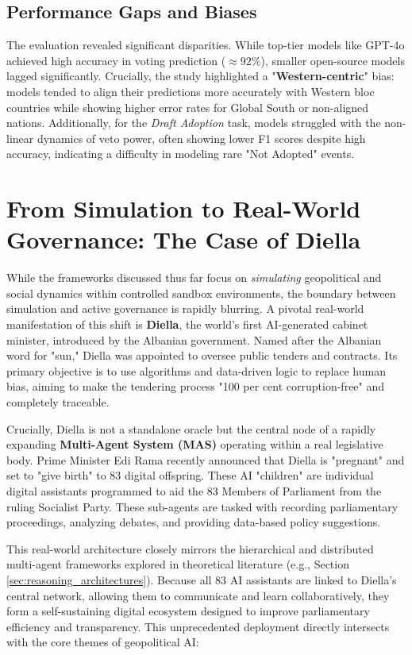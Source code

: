 \subsection{Performance Gaps and Biases}
The evaluation revealed significant disparities. While top-tier models like GPT-4o achieved high accuracy in voting prediction (\textbf{$\approx 92\%$}), smaller open-source models lagged significantly.
Crucially, the study highlighted a "\textbf{Western-centric}" bias: models tended to align their predictions more accurately with Western bloc countries while showing higher error rates for Global South or non-aligned nations. Additionally, for the \textit{Draft Adoption} task, models struggled with the non-linear dynamics of veto power, often showing lower F1 scores despite high accuracy, indicating a difficulty in modeling rare "Not Adopted" events.

\section{From Simulation to Real-World Governance: The Case of Diella}
\label{sec:diella_real_world}

While the frameworks discussed thus far focus on \textit{simulating} geopolitical and social dynamics within controlled sandbox environments, the boundary between simulation and active governance is rapidly blurring. A pivotal real-world manifestation of this shift is \textbf{Diella}, the world's first AI-generated cabinet minister, introduced by the Albanian government. Named after the Albanian word for "sun," Diella was appointed to oversee public tenders and contracts. Its primary objective is to use algorithms and data-driven logic to replace human bias, aiming to make the tendering process "100 per cent corruption-free" and completely traceable.

Crucially, Diella is not a standalone oracle but the central node of a rapidly expanding \textbf{Multi-Agent System (MAS)} operating within a real legislative body. Prime Minister Edi Rama recently announced that Diella is "pregnant" and set to "give birth" to 83 digital offspring. These AI "children" are individual digital assistants programmed to aid the 83 Members of Parliament from the ruling Socialist Party. These sub-agents are tasked with recording parliamentary proceedings, analyzing debates, and providing data-based policy suggestions.

This real-world architecture closely mirrors the hierarchical and distributed multi-agent frameworks explored in theoretical literature (e.g., Section \ref{sec:reasoning_architectures}). Because all 83 AI assistants are linked to Diella's central network, allowing them to communicate and learn collaboratively, they form a self-sustaining digital ecosystem designed to improve parliamentary efficiency and transparency. This unprecedented deployment directly intersects with the core themes of geopolitical AI:

